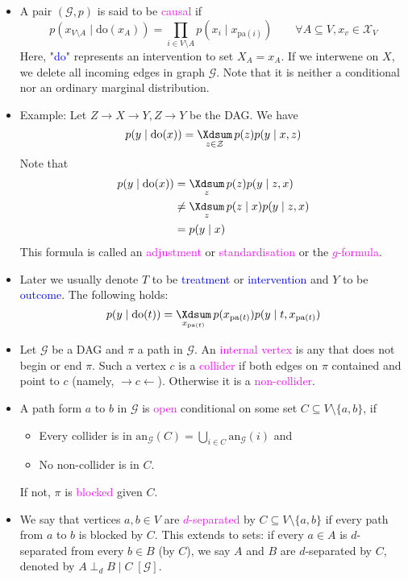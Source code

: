 \documentclass[UTF8]{book}
\DeclareMathOperator*{\Xsum}{\mathchoice{\Xdsum}{\Xtsum}{\Xtsum}{\Xtsum}}
\newcommand{\et}{&}
\newcommand{\concept}[1]{\textcolor{magenta}{#1}}
\renewcommand{\emph}[1]{\textcolor{blue}{#1}}
\begin{document}
\begin{itemize}
\item A pair $(\mathcal{G}, p)$ is said to be \concept{causal} if
$$
p(x_{V\setminus A}\mid \mathrm{do}(x_A)) = \prod_{i\in V\setminus A}p(x_i\mid x_{\mathrm{pa}(i)}) \qquad \forall A\subseteq V, x_v\in \mathcal{X}_V
$$
Here, "\emph{do}" represents an intervention to set $X_A = x_A$. If we interwene on $X$, we delete all incoming edges in graph $\mathcal{G}$. Note that it is neither a conditional nor an ordinary marginal distribution.
\item Example: Let $Z\rightarrow X\rightarrow Y, Z\rightarrow Y$ be the DAG. We have
$$
p(y\mid\mathrm{do}(x)) = \Xsum_{z\in\mathcal{Z}} p(z)p(y\mid x,z)
$$
Note that
\begin{align*}
	p(y\mid\mathrm{do}(x)) \et = \Xsum_z p(z)p(y\mid z,x)\\
	\et \neq \Xsum_z p(z\mid x)p(y\mid z,x)\\
	\et = p(y\mid x)
\end{align*}
This formula is called an \concept{adjustment} or \concept{standardisation} or the \concept{$g$-formula}.
\item Later we usually denote $T$ to be \emph{treatment} or \emph{intervention} and $Y$ to be \emph{outcome}. The following holds:
$$
p(y\mid\mathrm{do}(t)) = \Xsum_{x_{\mathrm{pa}(t)}}p(x_{\mathrm{pa}(t)})p(y\mid t, x_{\mathrm{pa}(t)})
$$
\item Let $\mathcal{G}$ be a DAG and $\pi$ a path in $\mathcal{G}$. An \concept{internal vertex} is any that does not begin or end $\pi$. Such a vertex $c$ is a \concept{collider} if both edges on $\pi$ contained and point to $c$ (namely, $\rightarrow c\leftarrow$). Otherwise it is a \concept{non-collider}.
\item A path form $a$ to $b$ in $\mathcal{G}$ is \concept{open} conditional on some set $C\subseteq V\setminus\{a,b\}$, if 
\begin{itemize}
	\item Every collider is in $\mathrm{an}_\mathcal{G}(C) = \bigcup_{i\in C}\mathrm{an}_\mathcal{G}(i)$ and
	\item No non-collider is in $C$.
\end{itemize}
If not, $\pi$ is \concept{blocked} given $C$.
\item We say that vertices $a,b\in V$ are \concept{$d$-separated} by $C\subseteq V\setminus\{a,b\}$ if every path from $a$ to $b$ is blocked by $C$. This extends to sets: if every $a\in A$ is $d$-separated from every $b\in B$ (by $C$), we say $A$ and $B$ are $d$-separated by $C$, denoted by $A\perp_d B\mid C\; [\mathcal{G}]$.

\end{itemize}
\end{document}
